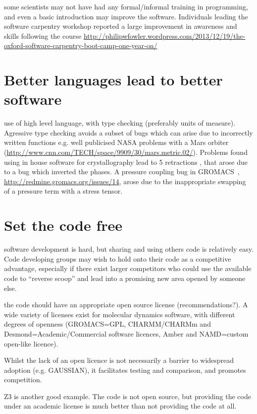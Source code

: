 \documentclass[conference]{IEEEtran}
\begin{document}
some scientists may not have had any formal/informal training in programming, and even a basic introduction may improve the software. Individuals leading the software carpentry workshop reported a large improvement in awareness and skills following the course \url{http://philipwfowler.wordpress.com/2013/12/19/the-oxford-software-carpentry-boot-camp-one-year-on/}


\section{Better languages lead to better software} 

use of high level language, with type checking (preferably units of
measure). Agressive type checking avoids a subset of bugs which can
arise due to incorrectly written functions e.g. well publicised NASA
problems with a Mars orbiter
(\url{http://www.cnn.com/TECH/space/9909/30/mars.metric.02/}). Problems
found using in house software for crystallography lead to 5
retractions \cite{Miller2006}, that arose due to a bug which inverted
the phases. A pressure coupling bug in GROMACS~\cite{Hess2008},
\url{http://redmine.gromacs.org/issues/14}, arose due to the
inappropriate swapping of a pressure term with a stress tensor.

\section{Set the code free} 

software development is hard, but sharing and using others code is
relatively easy. Code developing groups may wish to hold onto their
code as a competitive advantage, especially if there exist larger
competitors who could use the available code to ``reverse scoop'' and
lead into a promising new area opened by someone else.

the code should have an appropriate open source license
(recommendations?). A wide variety of licenses exist for molecular
dynamics software, with different degrees of openness (GROMACS=GPL,
CHARMM/CHARMm and Desmond=Academic/Commercial software licences, Amber
and NAMD=custom open-like licence).

Whilst the lack of an open licence is not necessarily a barrier to
widespread adoption (e.g. GAUSSIAN), it facilitates testing and
comparison, and promotes competition.

Z3 is another good example. The code is not open source, but providing
the code under an academic license is much better than not providing
the code at all.
\end{document}
